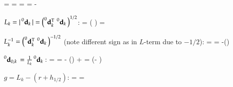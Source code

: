   \be
    \diffANCFt{\ANCFdkt} = 
    = 
  \ee
  \be
    \diffmIt{\ANCFdkt} = 
    = -
  \ee
  \item $L_k = |\prescript{0}{}{\mathbf{d}_k}\,| = \left(\prescript{0}{}{\mathbf{d}_k^\mathrm{T}}\, \prescript{0}{}{\mathbf{d}_k}\, \right) ^{1/2}$:
  \be
    \diffANCFmI{ |\ANCFdk| } = \left( \diffANCFdk \right) =
    \ANCFdkOtp \diffANCFdk 
  \ee
  \item $L_k^{-1} = \left(\prescript{0}{}{\mathbf{d}_k^\mathrm{T}}\, \prescript{0}{}{\mathbf{d}_k}\, \right) ^{-1/2}$ (note different sign as in $L$-term due to $-1/2$):
  \be
     =  = 
    -\left(\ANCFdkOtp \diffANCFdk \right)
  \ee
  \item $\prescript{0}{}{\mathbf{d}_{0,k}}\, = \frac{1}{L_k} \prescript{0}{}{\mathbf{d}_k}\,$: 
  \be
    \diffANCFmI{ \ANCFdkO } =  = 
    - \ANCFdk \otimes \left(\ANCFdkOtp \diffANCFdk \right) 
    +  \diffANCFdk =  \left(\Im - \ANCFdkO \otimes \ANCFdkO \right) \diffANCFdk
    \ee
  \item $g= L_k - (r + h_{1/2})$:
  \be
     =  =
    \ANCFdkOtp \diffANCFdk 
  \ee

